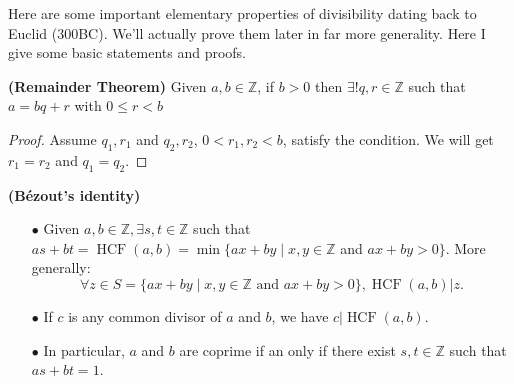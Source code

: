 \documentclass{article}
\newcommand{\bfs}[1]{\textbf{({#1}) }}
\newcommand{\HCF}{\operatorname{HCF}}
\begin{document}
Here are some important elementary properties of divisibility dating back to Euclid (300BC). We'll actually prove them later in far more generality. Here I give some basic statements and proofs.
\begin{thma}{\bfs{Remainder Theorem}}
Given $a, b \in \mathbb{Z}$, if $b>0$ then $\exists ! q, r \in \mathbb{Z}$ such that $a=b q+r$ with $0 \leq r<b$
\end{thma}
\begin{proof}
Assume $q_1, r_1$ and $q_2,r_2$, $0<r_1,r_2<b$, satisfy the condition. We will get $r_1=r_2$ and $q_1=q_2$.
\end{proof}
\begin{thma}{\bfs{B\'{e}zout's identity}}\label{thm:bezout}
\begin{enumerate}
  \item[$\bullet$] Given $a, b \in \mathbb{Z}, \exists s, t \in \mathbb{Z}$ such that $as +bt=\HCF(a, b)= \min \{a x+b y \mid x, y \in \mathbb{Z}$ and $a x+b y>0\}.$ 
More generally:
$$\forall z\in S=\{a x+b y \mid x, y \in \mathbb{Z}\text{ and }a x+b y>0\}, \HCF(a,b)|z.$$
\item[$\bullet$] If $c$ is any common divisor of $a$ and $b$, we have  $c | \HCF(a,b)$.
\item[$\bullet$] In particular, $a$ and $b$ are coprime if an only if there exist $s, t \in \mathbb{Z}$ such that $a s+b t=1$.
  \end{enumerate} 
\end{thma}
\end{document}
